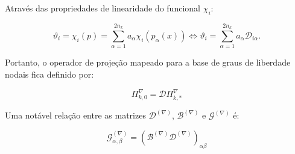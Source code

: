     \indent Através das propriedades de linearidade do funcional $\chi_i$:
    
    \begin{equation}
        \vartheta_i = \chi_i(p) = \sum_{\alpha=1}^{2n_k} a_\alpha \chi_i \left( p_\alpha (x) \right) \Leftrightarrow \vartheta_i = \sum_{\alpha=1}^{2n_k} a_\alpha \mathcal{D}_{i\alpha}.
        \label{eq:4.36}
    \end{equation}

    \indent Portanto, o operador de projeção mapeado para a base de graus de liberdade nodais fica definido por: 
    
    \begin{equation}
        \Pi_{k,0}^\nabla = \mathcal{D} \Pi_{k,*}^\nabla
        \label{eq:4.37}
    \end{equation}

    \indent Uma notável relação entre as matrizes $\mathcal{D}^{(\nabla)}$, $\mathcal{B}^{(\nabla)}$ e $\mathcal{G}^{(\nabla)}$ é:

    \begin{equation}
        \mathcal{G}_{\alpha,\beta}^{(\nabla)} = \left(\mathcal{B}^{(\nabla)}\mathcal{D}^{(\nabla)}\right)_{\alpha\beta}
        \label{eq:4.38}
    \end{equation}

    \vspace{5mm}
    \vspace{5mm}

